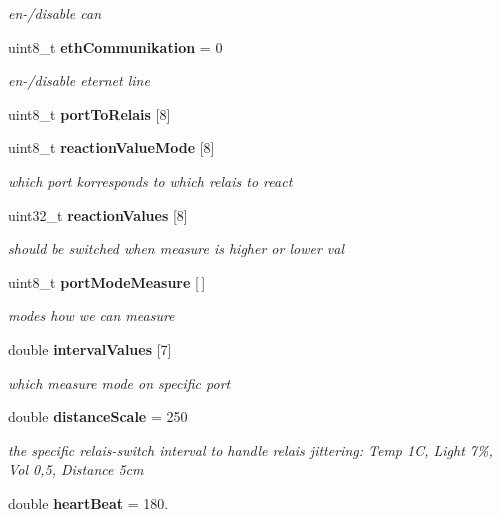 \begin{DoxyCompactItemize}
\begin{DoxyCompactList}\small\item\em en-\//disable can \end{DoxyCompactList}\item 
uint8\-\_\-t {\bf eth\-Communikation} = 0\label{group__main_ga48cf4117469613426debd4f85c460808}

\begin{DoxyCompactList}\small\item\em en-\//disable eternet line \end{DoxyCompactList}\item 
uint8\-\_\-t {\bfseries port\-To\-Relais} [8]\label{group__main_ga57b981cfd8c3af7a1cdf90770f85aa8d}

\item 
uint8\-\_\-t {\bf reaction\-Value\-Mode} [8]\label{group__main_ga56c8fe85f8461ba0d291361c3a933870}

\begin{DoxyCompactList}\small\item\em which port korresponds to which relais to react \end{DoxyCompactList}\item 
uint32\-\_\-t {\bf reaction\-Values} [8]\label{group__main_ga8908e7ed7819607140342740d85e2b56}

\begin{DoxyCompactList}\small\item\em should be switched when measure is higher or lower val \end{DoxyCompactList}\item 
uint8\-\_\-t {\bf port\-Mode\-Measure} [$\,$]
\begin{DoxyCompactList}\small\item\em modes how we can measure \end{DoxyCompactList}\item 
double {\bf interval\-Values} [7]\label{group__main_gabf0863d719058ff6e45a37b5bcf04b48}

\begin{DoxyCompactList}\small\item\em which measure mode on specific port \end{DoxyCompactList}\item 
double {\bf distance\-Scale} = 250\label{group__main_gab3ee56c263833429c4f874777c7c8213}

\begin{DoxyCompactList}\small\item\em the specific relais-\/switch interval to handle relais jittering\-: \-Temp 1\-C, \-Light 7\%, \-Vol 0,5, \-Distance 5cm \end{DoxyCompactList}\item 
double {\bf heart\-Beat} = 180.\label{group__main_ga247b18b1a4a3625b0ff4f0792c8d1d3d}


\end{DoxyCompactItemize}

